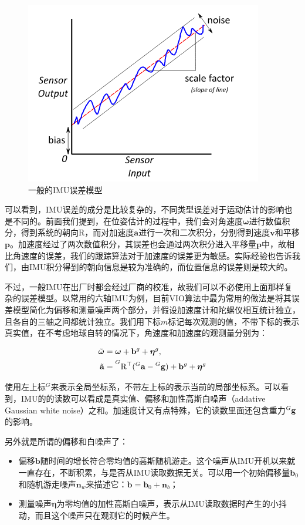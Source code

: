 \begin{figure}[htb!]
    \centering
    \includegraphics[width=.3\textwidth]{./figs/common_imu_errors.png}
    \caption{一般的IMU误差模型\citep{imu2014}}
    \label{fig:common_imu_errors}
\end{figure}

可以看到，IMU误差的成分是比较复杂的，不同类型误差对于运动估计的影响也是不同的。前面我们提到，在位姿估计的过程中，我们会对角速度$\bm\omega$进行数值积分，得到系统的朝向$\mathrm{R}$，而对加速度$\mathbf{a}$进行一次和二次积分，分别得到速度$\mathbf{v}$和平移$\mathbf{p}$。加速度经过了两次数值积分，其误差也会通过两次积分进入平移量$\mathbf{p}$中，故相比角速度的误差，我们的跟踪算法对于加速度的误差更为敏感。实际经验也告诉我们，由IMU积分得到的朝向信息是较为准确的，而位置信息的误差则是较大的。

不过，一般IMU在出厂时都会经过厂商的校准，故我们可以不必使用上面那样复杂的误差模型。以常用的六轴IMU为例，目前VIO算法中最为常用的做法是将其误差模型简化为偏移和测量噪声两个部分，并假设加速度计和陀螺仪相互统计独立，且各自的三轴之间都统计独立。我们用下标$m$标记每次观测的值，不带下标的表示真实值，在不考虑地球自转的情况下，角速度和加速度的观测量分别为\citep{mourikis2007multi}：

\begin{equation}
\begin{aligned}
    \tilde{\bm\omega} &= \bm\omega + \mathbf{b}^g + \bm\eta^g,  \\
    \tilde{\mathbf a} &= \prescript{G}{}{\mathrm{R}^\top}
                         (\prescript{G}{}{\mathbf a} - \prescript{G}{}{\mathbf g}) +
                         \mathbf{b}^g + \bm\eta^g
\end{aligned}
\end{equation}

使用左上标$^G$来表示全局坐标系，不带左上标的表示当前的局部坐标系。可以看到，IMU的的读数可以看成是真实值、偏移和加性高斯白噪声（addative Gaussian white noise）之和。加速度计又有点特殊，它的读数里面还包含重力$\prescript{G}{}{\mathbf g}$的影响。

另外就是所谓的偏移和白噪声了：
\begin{itemize}
    \item 偏移$\mathbf{b}$随时间的增长符合零均值的高斯随机游走。这个噪声从IMU开机以来就一直存在，不断积累，与是否从IMU读取数据无关。可以用一个初始偏移量$\mathbf{b}_0$和随机游走噪声$\mathbf{n}_w$来描述它：$\mathbf{b} = \mathbf{b}_0 + \mathbf{n}_b$；
    \item 测量噪声$\bm\eta$为零均值的加性高斯白噪声，表示从IMU读取数据时产生的小抖动，而且这个噪声只在观测它的时候产生。
\end{itemize}

